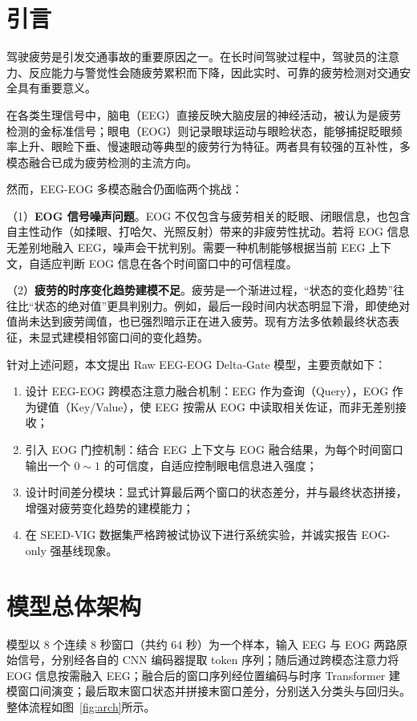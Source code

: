 \documentclass[11pt,a4paper]{ctexart}
\begin{document}
\section{引言}

驾驶疲劳是引发交通事故的重要原因之一。在长时间驾驶过程中，驾驶员的注意力、反应能力与警觉性会随疲劳累积而下降，因此实时、可靠的疲劳检测对交通安全具有重要意义。

在各类生理信号中，脑电（EEG）直接反映大脑皮层的神经活动，被认为是疲劳检测的金标准信号；眼电（EOG）则记录眼球运动与眼睑状态，能够捕捉眨眼频率上升、眼睑下垂、慢速眼动等典型的疲劳行为特征。两者具有较强的互补性，多模态融合已成为疲劳检测的主流方向。

然而，EEG-EOG 多模态融合仍面临两个挑战：

（1）\textbf{EOG 信号噪声问题}。EOG 不仅包含与疲劳相关的眨眼、闭眼信息，也包含自主性动作（如揉眼、打哈欠、光照反射）带来的非疲劳性扰动。若将 EOG 信息无差别地融入 EEG，噪声会干扰判别。需要一种机制能够根据当前 EEG 上下文，自适应判断 EOG 信息在各个时间窗口中的可信程度。

（2）\textbf{疲劳的时序变化趋势建模不足}。疲劳是一个渐进过程，``状态的变化趋势''往往比``状态的绝对值''更具判别力。例如，最后一段时间内状态明显下滑，即使绝对值尚未达到疲劳阈值，也已强烈暗示正在进入疲劳。现有方法多依赖最终状态表征，未显式建模相邻窗口间的变化趋势。

针对上述问题，本文提出 Raw EEG-EOG Delta-Gate 模型，主要贡献如下：
\begin{enumerate}
  \item 设计 EEG-EOG 跨模态注意力融合机制：EEG 作为查询（Query），EOG 作为键值（Key/Value），使 EEG 按需从 EOG 中读取相关佐证，而非无差别接收；
  \item 引入 EOG 门控机制：结合 EEG 上下文与 EOG 融合结果，为每个时间窗口输出一个 $0\!\sim\!1$ 的可信度，自适应控制眼电信息进入强度；
  \item 设计时间差分模块：显式计算最后两个窗口的状态差分，并与最终状态拼接，增强对疲劳变化趋势的建模能力；
  \item 在 SEED-VIG 数据集严格跨被试协议下进行系统实验，并诚实报告 EOG-only 强基线现象。
\end{enumerate}

\section{模型总体架构}

模型以 8 个连续 8 秒窗口（共约 64 秒）为一个样本，输入 EEG 与 EOG 两路原始信号，分别经各自的 CNN 编码器提取 token 序列；随后通过跨模态注意力将 EOG 信息按需融入 EEG；融合后的窗口序列经位置编码与时序 Transformer 建模窗口间演变；最后取末窗口状态并拼接末窗口差分，分别送入分类头与回归头。整体流程如图~\ref{fig:arch}所示。
\end{document}
